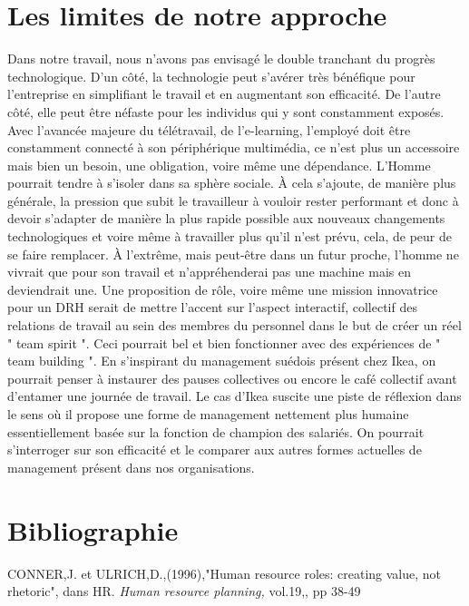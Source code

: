 \documentclass[a4paper, 12pt]{article}
\begin{document}
\section{Les limites de notre approche}

Dans notre travail, nous n'avons pas envisagé le double tranchant du progrès technologique. D'un côté, la technologie peut s'avérer très bénéfique pour l'entreprise en simplifiant le travail et en augmentant son efficacité. De l'autre côté, elle peut être néfaste pour les individus qui y sont constamment exposés. Avec l'avancée majeure du télétravail, de l'e-learning, l'employé doit être constamment connecté à son périphérique multimédia, ce n'est plus un accessoire mais bien un besoin, une obligation, voire même une dépendance. L'Homme pourrait tendre à s'isoler dans sa sphère sociale. À cela s'ajoute, de manière plus générale, la pression que subit le travailleur à vouloir rester performant et donc à devoir s'adapter de manière la plus rapide possible aux nouveaux changements technologiques et voire même à travailler plus qu'il n'est prévu,  cela, de peur de se faire remplacer. À l'extrême, mais peut-être dans un futur proche, l'homme ne vivrait que pour son travail et n'appréhenderai pas une machine mais en deviendrait une. 
Une proposition de rôle, voire même une mission innovatrice pour un DRH serait de mettre l'accent sur l'aspect interactif, collectif des relations de travail au sein des membres du personnel dans le but de créer un réel " team spirit ". Ceci pourrait bel et bien fonctionner avec des expériences de " team building ". En s'inspirant du management suédois présent chez Ikea, on pourrait penser à instaurer des pauses collectives ou encore le café collectif avant d'entamer une journée de travail. Le cas d'Ikea suscite une piste de réflexion dans le sens où il propose une forme de management nettement plus humaine essentiellement basée sur la fonction de champion des salariés. On pourrait s'interroger sur son efficacité et le comparer aux autres formes actuelles de management présent dans nos organisations.   

\section{Bibliographie}

\noindent CONNER,J. et ULRICH,D.,(1996),"Human resource roles: creating value, not rhetoric", dans HR. \textit{Human resource planning,} vol.19,, pp 38-49
\vspace{0.5cm}
\end{document}
